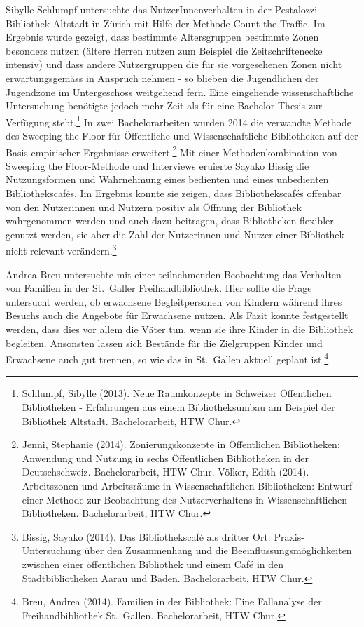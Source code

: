 \documentclass[a4paper,
fontsize=11pt,
oneside,
numbers=noperiodatend,
parskip=half-,
bibliography=totoc,
final
]{scrartcl}
\begin{document}
Sibylle Schlumpf untersuchte das NutzerInnenverhalten in der Pestalozzi
Bibliothek Altstadt in Zürich mit Hilfe der Methode Count-the-Traffic.
Im Ergebnis wurde gezeigt, dass bestimmte Altersgruppen bestimmte Zonen
besonders nutzen (ältere Herren nutzen zum Beispiel die
Zeitschriftenecke intensiv) und dass andere Nutzergruppen die für sie
vorgesehenen Zonen nicht erwartungsgemäss in Anspruch nehmen - so
blieben die Jugendlichen der Jugendzone im Untergeschoss weitgehend
fern. Eine eingehende wissenschaftliche Untersuchung benötigte jedoch
mehr Zeit als für eine Bachelor-Thesis zur Verfügung steht.\footnote{Schlumpf,
  Sibylle (2013). Neue Raumkonzepte in Schweizer Öffentlichen
  Bibliotheken - Erfahrungen aus einem Bibliotheksumbau am Beispiel der
  Bibliothek Altstadt. Bachelorarbeit, HTW Chur.} In zwei
Bachelorarbeiten wurden 2014 die verwandte Methode des Sweeping the
Floor für Öffentliche und Wissenschaftliche Bibliotheken auf der Basis
empirischer Ergebnisse erweitert.\footnote{Jenni, Stephanie (2014).
  Zonierungskonzepte in Öffentlichen Bibliotheken: Anwendung und Nutzung
  in sechs Öffentlichen Bibliotheken in der Deutschschweiz.
  Bachelorarbeit, HTW Chur. Völker, Edith (2014). Arbeitszonen und
  Arbeitsräume in Wissenschaftlichen Bibliotheken: Entwurf einer Methode
  zur Beobachtung des Nutzerverhaltens in Wissenschaftlichen
  Bibliotheken. Bachelorarbeit, HTW Chur.} Mit einer Methodenkombination
von Sweeping the Floor-Methode und Interviews eruierte Sayako Bissig die
Nutzungsformen und Wahrnehmung eines bedienten und eines unbedienten
Bibliothekscafés. Im Ergebnis konnte sie zeigen, dass Bibliothekscafés
offenbar von den Nutzerinnen und Nutzern positiv als Öffnung der
Bibliothek wahrgenommen werden und auch dazu beitragen, dass
Bibliotheken flexibler genutzt werden, sie aber die Zahl der Nutzerinnen
und Nutzer einer Bibliothek nicht relevant verändern.\footnote{Bissig,
  Sayako (2014). Das Bibliothekscafé als dritter Ort:
  Praxis-Untersuchung über den Zusammenhang und die
  Beeinflussungsmöglichkeiten zwischen einer öffentlichen Bibliothek und
  einem Café in den Stadtbibliotheken Aarau und Baden. Bachelorarbeit,
  HTW Chur.}

Andrea Breu untersuchte mit einer teilnehmenden Beobachtung das
Verhalten von Familien in der St.~Galler Freihandbibliothek. Hier sollte
die Frage untersucht werden, ob erwachsene Begleitpersonen von Kindern
während ihres Besuchs auch die Angebote für Erwachsene nutzen. Als Fazit
konnte festgestellt werden, dass dies vor allem die Väter tun, wenn sie
ihre Kinder in die Bibliothek begleiten. Ansonsten lassen sich Bestände
für die Zielgruppen Kinder und Erwachsene auch gut trennen, so wie das
in St.~Gallen aktuell geplant ist.\footnote{Breu, Andrea (2014).
  Familien in der Bibliothek: Eine Fallanalyse der Freihandbibliothek
  St.~Gallen. Bachelorarbeit, HTW Chur.}
\end{document}
